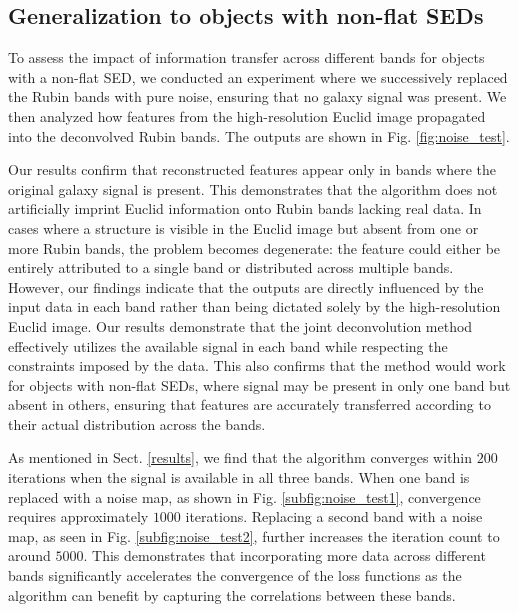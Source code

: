 \documentclass[traditabstract]{aa}
\begin{document}



\begin{appendix} 

\section{Generalization to objects with non-flat SEDs}
\label{sec:noise_test}

To assess the impact of information transfer across different bands for objects with a non-flat SED, we conducted an experiment where we successively replaced the Rubin bands with pure noise, ensuring that no galaxy signal was present. We then analyzed how features from the high-resolution Euclid image propagated into the deconvolved Rubin bands. The outputs are shown in Fig. \ref{fig:noise_test}.

Our results confirm that reconstructed features appear only in bands where the original galaxy signal is present. This demonstrates that the algorithm does not artificially imprint Euclid information onto Rubin bands lacking real data. In cases where a structure is visible in the Euclid image but absent from one or more Rubin bands, the problem becomes degenerate: the feature could either be entirely attributed to a single band or distributed across multiple bands. However, our findings indicate that the outputs are directly influenced by the input data in each band rather than being dictated solely by the high-resolution Euclid image. Our results demonstrate that the joint deconvolution method effectively utilizes the available signal in each band while respecting the constraints imposed by the data. This also confirms that the method would work for objects with non-flat SEDs, where signal may be present in only one band but absent in others, ensuring that features are accurately transferred according to their actual distribution across the bands. 

As mentioned in Sect. \ref{results}, we find that the algorithm converges within $200$ iterations when the signal is available in all three bands. When one band is replaced with a noise map, as shown in Fig. \ref{subfig:noise_test1}, convergence requires approximately $1000$ iterations. Replacing a second band with a noise map, as seen in Fig. \ref{subfig:noise_test2}, further increases the iteration count to around $5000$. This demonstrates that incorporating more data across different bands significantly accelerates the convergence of the loss functions as the algorithm can benefit by capturing the correlations between these bands.


\end{appendix}
\end{document}
